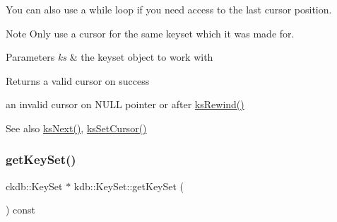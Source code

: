  You can also use a while loop if you need access to the last cursor position.


 \begin{DoxyNote}{Note}
Only use a cursor for the same keyset which it was made for.
\end{DoxyNote}

\begin{DoxyParams}{Parameters}
{\em ks} & the keyset object to work with \\
\hline
\end{DoxyParams}
\begin{DoxyReturn}{Returns}
a valid cursor on success 

an invalid cursor on N\+U\+LL pointer or after \hyperlink{group__keyset_gabe793ff51f1728e3429c84a8a9086b70}{ks\+Rewind()} 
\end{DoxyReturn}
\begin{DoxySeeAlso}{See also}
\hyperlink{group__keyset_ga317321c9065b5a4b3e33fe1c399bcec9}{ks\+Next()}, \hyperlink{group__keyset_ga28b2a7d13c620b3c9d4815a0608c738f}{ks\+Set\+Cursor()} 
\end{DoxySeeAlso}
\mbox{\label{classkdb_1_1KeySet_a4e9a3906e0b18a783f8a6e8bdbec9ed0}} 
\subsubsection{\texorpdfstring{get\+Key\+Set()}{getKeySet()}}
{\footnotesize\ttfamily ckdb\+::\+Key\+Set $\ast$ kdb\+::\+Key\+Set\+::get\+Key\+Set (\begin{DoxyParamCaption}{ }\end{DoxyParamCaption}) const\hspace{0.3cm}{\ttfamily [inline]}}



